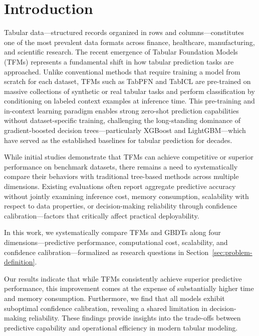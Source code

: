 \documentclass{SYSUReport}
\begin{document}


\section{Introduction}
Tabular data—structured records organized in rows and columns—constitutes one of the most prevalent data formats across finance, healthcare, manufacturing, and scientific research. The recent emergence of Tabular Foundation Models (TFMs) represents a fundamental shift in how tabular prediction tasks are approached. Unlike conventional methods that require training a model from scratch for each dataset, TFMs such as TabPFN and TabICL are pre-trained on massive collections of synthetic or real tabular tasks and perform classification by conditioning on labeled context examples at inference time. This pre-training and in-context learning paradigm enables strong zero-shot prediction capabilities without dataset-specific training, challenging the long-standing dominance of gradient-boosted decision trees—particularly XGBoost and LightGBM—which have served as the established baselines for tabular prediction for decades.

While initial studies demonstrate that TFMs can achieve competitive or superior performance on benchmark datasets, there remains a need to systematically compare their behaviors with traditional tree-based methods across multiple dimensions. Existing evaluations often report aggregate predictive accuracy without jointly examining inference cost, memory consumption, scalability with respect to data properties, or decision-making reliability through confidence calibration—factors that critically affect practical deployability.

In this work, we systematically compare TFMs and GBDTs along four dimensions—predictive performance, computational cost, scalability, and confidence calibration—formalized as research questions in Section~\ref{sec:problem-definition}.

Our results indicate that while TFMs consistently achieve superior predictive performance, this improvement comes at the expense of substantially higher time and memory consumption. Furthermore, we find that all models exhibit suboptimal confidence calibration, revealing a shared limitation in decision-making reliability. These findings provide insights into the trade-offs between predictive capability and operational efficiency in modern tabular modeling.
\end{document}
